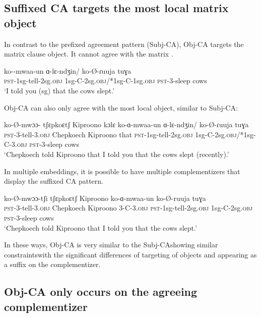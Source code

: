 \documentclass[output=paper
,newtxmath
,modfonts
,nonflat]{langsci/langscibook}
\begin{document}
\subsection{Suffixed CA targets the most local matrix object}

In contrast to the prefixed agreement pattern (Subj-CA), Obj-CA targets the matrix clause object. It cannot agree with the matrix .

\ea 
\gll ko--mwaa-un ɑ-lɛ-ndʒin/ ko-\O-ɾuuja tuɣa \\
\textsc{pst}-1sg-tell-2sg.\textsc{obj} 1sg-C-2sg.\textsc{obj}/*1sg-C-1sg.\textsc{obj} \textsc{pst}-3-sleep cows \\
\glt `I told you (sg) that the cows slept.'
\z

\noindent Obj-CA can also only agree with the most local object, similar to Subj-CA: 

\ea
\gll ko-\O-mwɔɔ- tʃɛpkoɛtʃ Kiproono kɔlɛ ko-ɑ-mwaa-un ɑ-lɛ-ndʒin/ ko-\O-ɾuuja tuɣa \\
\textsc{pst}-3-tell-3.\textsc{obj} Chepkoech Kiproono that \textsc{pst}-1sg-tell-2sg.\textsc{obj} 1sg-C-2sg.\textsc{obj}/*1sg-C-3.\textsc{obj} \textsc{pst}-3-sleep cows \\
\glt `Chepkoech told Kiproono that I told you that the cows slept (recently).'
\z

\noindent In multiple embeddings, it is possible to have multiple complementizers that display the suffixed CA pattern.

\ea
\gll ko-\O-mwɔɔ-tʃi tʃɛpkoɛtʃ Kiproono  ko-ɑ-mwaa-un  ko-\O-ruuja tuɣa \\
\textsc{pst}-3-tell-3.\textsc{obj} Chepkoech Kiproono 3-C-3.\textsc{obj} \textsc{pst}-1sg-tell-2sg.\textsc{obj} 1sg-C-2sg.\textsc{obj} \textsc{pst}-3-sleep cows \\
\glt `Chepkoech told Kiproono that I told you that the cows slept.'
\z

\noindent In these ways, Obj-CA is very similar to the Subj-CA\textemdash showing similar  constraints\textemdash with the significant differences of targeting of objects and appearing as a suffix on the complementizer.

\subsection{Obj-CA only occurs on the agreeing complementizer} \label{Obj-CA Parasitic}
\end{document}
